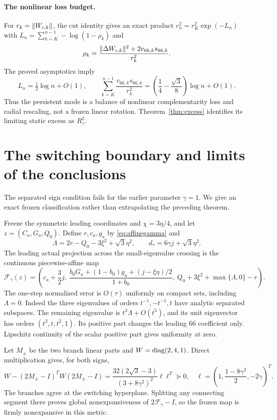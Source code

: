 \documentclass[11pt]{article}
\theoremstyle{remark}\newtheorem{remark}[theorem]{Remark}
\numberwithin{equation}{section}
\begin{document}
\paragraph{The nonlinear loss budget.}
For $r_k=\lVert W_{c,k}\rVert$, the cut identity gives an exact product $r_n^2=r_K^2\exp(-L_n)$ with $L_n=\sum_{k=K}^{n-1}-\log(1-\rho_k)$ and
\[
 \rho_k=\frac{\lVert \Delta W_{c,k}\rVert^2+2v_{66,k}s_{66,k}}{r_k^2}.
\]
The proved asymptotics imply
\[
 L_n=\tfrac12\log n+O(1),\qquad
 \sum_{k=K}^{n-1}\frac{v_{66,k}s_{66,k}}{r_k^2}
 =\left(\frac14-\frac{\sqrt3}{8}\right)\log n+O(1).
\]
Thus the persistent mode is a balance of nonlinear complementarity loss and radial rescaling, not a frozen linear rotation. Theorem~\ref{thm:excess} identifies its limiting static excess as $R_\gamma^2$.

\section{The switching boundary and limits of the conclusions}
The separated sign condition fails for the earlier parameter $\gamma=1$. We give an exact frozen classification rather than extrapolating the preceding theorem.

Freeze the symmetric leading coordinates and $\chi=3\eta/4$, and let $z=(C_a,G_a,Q_0)$. Define $r,c_a,g_a$ by \eqref{eq:affinegamma} and
\[
 \Lambda=2r-Q_0-3\xi^2+\sqrt3\eta^2,\qquad
 d_*=6\gamma j+\sqrt3\eta^2.
\]
The leading actual projection across the small-eigenvalue crossing is the continuous piecewise-affine map
\begin{equation}\label{eq:switch}
 \mathcal F_\gamma(z)=
 \left(c_a+\frac32j,\
 \frac{b_0G_a+(1-b_0)g_a+(j-\xi\eta)/2}{1+b_0},\
 Q_0+3\xi^2+\max\{\Lambda,0\}-r\right).
\end{equation}
The one-step normalized error is $O(\tau)$ uniformly on compact sets, including $\Lambda=0$. Indeed the three eigenvalues of orders $t^{-1},-t^{-1},t$ have analytic separated subspaces. The remaining eigenvalue is $t^3\Lambda+O(t^5)$, and its unit eigenvector has orders $(t^2,t,t^2,1)$. Its positive part changes the leading $66$ coefficient only. Lipschitz continuity of the scalar positive part gives uniformity at zero.

Let $M_\pm$ be the two branch linear parts and $W=\operatorname{diag}(2,4,1)$. Direct multiplication gives, for both signs,
\[
 W-(2M_\pm-I)^TW(2M_\pm-I)
 =\frac{32(2\sqrt3-3)}{(3+8\gamma^2)^2}\ell\ell^T\succeq0,
 \quad \ell=\left(1,\frac{1-8\gamma^2}{2},-2\gamma\right)^T.
\]
The branches agree at the switching hyperplane. Splitting any connecting segment there proves global nonexpansiveness of $2\mathcal F_\gamma-I$, so the frozen map is firmly nonexpansive in this metric.
\end{document}
